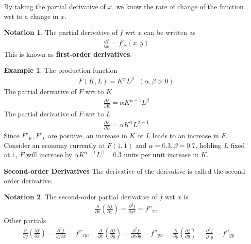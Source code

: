 \documentclass[10pt,a4paper]{book}
\theoremstyle{definition}\newtheorem{definition}{Definition}
\newtheorem{notation}{Notation}
\theoremstyle{definition}\newtheorem{fact}{Fact}
\theoremstyle{definition}\newtheorem{ex}{Ex.}
\theoremstyle{definition}\newtheorem{project}{Project}
\theoremstyle{definition}\newtheorem{problem}{Problem}
\theoremstyle{definition}\newtheorem{example}{Example}
\numberwithin{theorem}{chapter}
\numberwithin{corollary}{chapter}
\numberwithin{assumption}{chapter}
\numberwithin{definition}{chapter}
\numberwithin{prop}{chapter}
\numberwithin{notation}{chapter}
\numberwithin{problem}{chapter}
\numberwithin{example}{chapter}
\numberwithin{fact}{chapter}
\numberwithin{ex}{chapter}
\newenvironment{fnotation}
{\begin{mdframed}\begin{notation}}
		{\end{notation}\end{mdframed}}
\begin{document}
	By taking the partial derivative of $x$, we know the rate of change of the function wrt to a change in $x$.
	
	\begin{notation}
		The partial derivative of $f$ wrt $x$ can be written as
		\begin{align*}
			\frac{\partial f}{\partial x} = f'_x (x,y) 
		\end{align*}
		This is known as \textbf{first-order derivatives}.
	\end{notation}
	
	\begin{example}
		The production function
		\begin{align}
			F(K,L) = K^{\alpha} L^{\beta} \ \ \ (\alpha,\beta > 0) \label{eq:prod_func} 
		\end{align}
		The partial derivative of $F$ wrt to $K$
		\begin{align*}
			\frac{\partial F}{\partial K} = \alpha K^{\alpha-1} L^\beta 
		\end{align*}
		The partial derivative of $F$ wrt to $L$
		\begin{align*}
			\frac{\partial F}{\partial L} = \alpha K^\alpha L^{\beta-1} 
		\end{align*}
		Since $F'_K, F'_L$ are positive, an increase in $K$ or $L$ leads to an increase in $F$. Consider an economy currently at $F(1,1)$ and $\alpha=0.3,\beta=0.7$, holding $L$ fixed at $1$, $F$ will increase by $\alpha K^{\alpha-1} L^\beta = 0.3$ units per unit increase in $K$.
	\end{example}
	
	\textbf{Second-order Derivatives}
	The derivative of the derivative is called the second-order derivative.
	\begin{fnotation}
		The second-order partial derivative of $f$ wrt $x$ is
		\begin{align*}
			\frac{\partial}{\partial x} \left(\frac{\partial f}{\partial x}\right) = \frac{\partial^2 f}{\partial x^2} = f''_{xx} 
		\end{align*}
		Other partials
		\begin{align*} 
			& \frac{\partial}{\partial y} \left(\frac{\partial f}{\partial x}\right) = \frac{\partial^2 f}{\partial y \partial x} = f''_{xy}, \ 
			& \frac{\partial}{\partial x} \left(\frac{\partial f}{\partial y}\right) = \frac{\partial^2 f}{\partial x \partial y} = f''_{yx}, \ 
			& \frac{\partial}{\partial y} \left(\frac{\partial f}{\partial y}\right) = \frac{\partial^2 f}{\partial^2 y} = f''_{yy} \           
		\end{align*}
	\end{fnotation}
	
\end{document}
